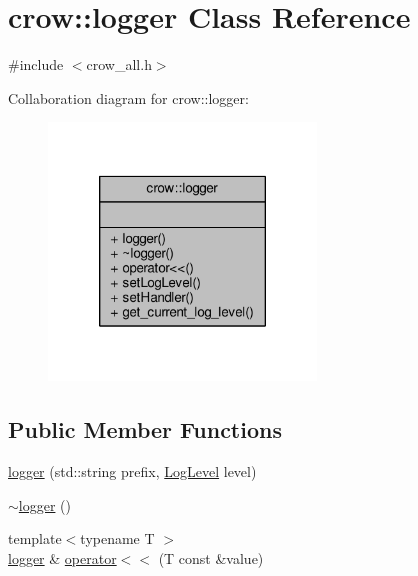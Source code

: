 \hypertarget{classcrow_1_1logger}{\section{crow\-:\-:logger Class Reference}
\label{classcrow_1_1logger}
}


{\ttfamily \#include $<$crow\-\_\-all.\-h$>$}



Collaboration diagram for crow\-:\-:logger\-:
\nopagebreak
\begin{figure}[H]
\begin{center}
\leavevmode
\includegraphics[width=202pt]{classcrow_1_1logger__coll__graph}
\end{center}
\end{figure}
\subsection*{Public Member Functions}
\begin{DoxyCompactItemize}
\item 
\hyperlink{classcrow_1_1logger_aea1504b0053f5b988b994543671c0dd5}{logger} (std\-::string prefix, \hyperlink{namespacecrow_ad07dc32e163caa516aa1225a1ec4afe4}{Log\-Level} level)
\item 
\hyperlink{classcrow_1_1logger_a59b838e541514c082a01e9111c5a11f6}{$\sim$logger} ()
\item 
{\footnotesize template$<$typename T $>$ }\\\hyperlink{classcrow_1_1logger}{logger} \& \hyperlink{classcrow_1_1logger_a854e9da406195e08aa7712c7d4ca27d0}{operator$<$$<$} (T const \&value)
\end{DoxyCompactItemize}
